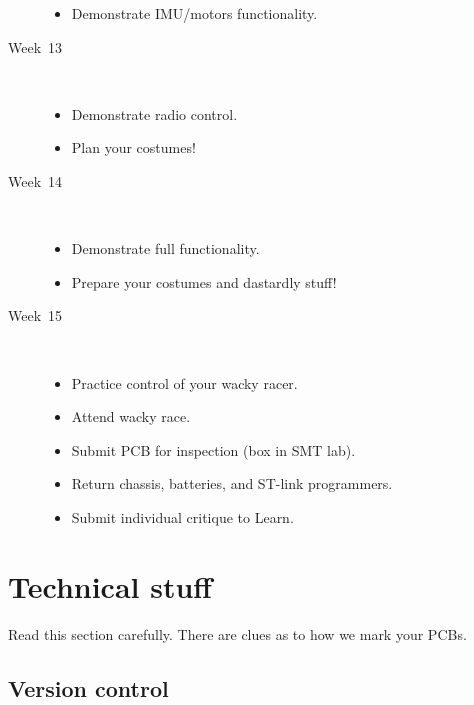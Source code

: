 \documentclass[11pt, a4paper]{article}
\begin{document}
\begin{description}
  \begin{itemize}
  \item Demonstrate IMU/motors functionality.
  \end{itemize}

\item [Week~13]\mbox{}\\[-0.4cm]

  \begin{itemize}
  \item Demonstrate radio control.

  \item Plan your costumes!
  \end{itemize}

\item [Week~14]\mbox{}\\[-0.4cm]

  \begin{itemize}
  \item Demonstrate full functionality.

  \item Prepare your costumes and dastardly stuff!
  \end{itemize}

\item [Week~15]\mbox{}\\[-0.4cm]

  \begin{itemize}
  \item Practice control of your wacky racer.
  \item Attend wacky race.
  \item Submit PCB for inspection (box in SMT lab).
  \item Return chassis, batteries, and ST-link programmers.
  \item Submit individual critique to Learn.
  \end{itemize}

\end{description}



\section{Technical stuff}

Read this section carefully.  There are clues as to how we mark your PCBs.

\subsection{Version control}
\end{document}
